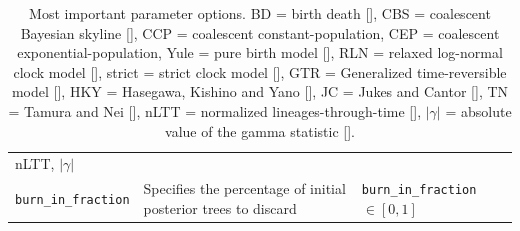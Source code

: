\begin{table}
\begin{tabular}{|p{3.4cm}|p{9.7cm}|p{4.5cm}@{}|}
    nLTT, $|\gamma|$ \\
    \verb;burn_in_fraction; &
    Specifies the percentage of initial posterior trees to discard &
    \verb;burn_in_fraction; $\in [0, 1]$\\
    \hline
  \end{tabular}
  \caption{
    Most important parameter options.
    BD = birth death [\cite{nee1994reconstructed}], 
    CBS = coalescent Bayesian skyline [\cite{drummond2005bayesian}], 
    CCP = coalescent constant-population, 
    CEP = coalescent exponential-population,
    Yule = pure birth model [\cite{yule}],
    RLN = relaxed log-normal clock model [\cite{drummond2006relaxed}],
    strict = strict clock model [\cite{zuckerkandl1965molecules}], 
    GTR = Generalized time-reversible model [\cite{tavare1986some}], 
    HKY = Hasegawa, Kishino and Yano [\cite{hasegawa1985dating}], 
    JC = Jukes and Cantor [\cite{jukes1969evolution}], 
    TN = Tamura and Nei [\cite{tamura1993estimation}],
    nLTT = normalized lineages-through-time [\cite{janzen2015approximate}],
    $|\gamma|$ = absolute value of the gamma statistic [\cite{pybus2000testing}].
  }
  \label{tab:options}
\bigskip


\end{table}
